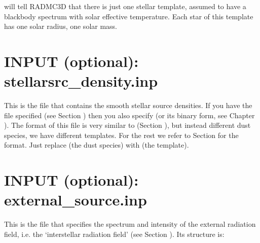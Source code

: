 \documentclass[letterpaper,10pt,english]{sphinxmanual}
\begin{document}
\begin{sphinxVerbatim}[commandchars=\\\{\}]
\end{sphinxVerbatim}

will tell RADMC\sphinxhyphen{}3D that there is just one stellar template, assumed to have
a blackbody spectrum with solar effective temperature. Each star of this
template has one solar radius, one solar mass.


\section{INPUT (optional): stellarsrc\_density.inp}
\label{\detokenize{inputoutputfiles:input-optional-stellarsrc-density-inp}}\label{\detokenize{inputoutputfiles:sec-stellarsrc-density}}
This is the file that contains the smooth stellar source densities. If you
have the file  specified (see Section
{\hyperref[\detokenize{inputoutputfiles:sec-stellarsrc-templates}]{}}) then you  also specify  (or its binary form, see Chapter
{\hyperref[\detokenize{binaryio:chap-binary-io}]{}}).  The format of this file is very similar to
 (Section {\hyperref[\detokenize{inputoutputfiles:sec-dustdens}]{}}), but instead
different dust species, we have different templates.  For the rest we refer
to Section {\hyperref[\detokenize{inputoutputfiles:sec-dustdens}]{}} for the format.  Just replace  (the dust species) with  (the template).


\section{INPUT (optional): external\_source.inp}
\label{\detokenize{inputoutputfiles:input-optional-external-source-inp}}\label{\detokenize{inputoutputfiles:sec-ext-src-inp}}
This is the file that specifies the spectrum and intensity of the
external radiation field, i.e. the ‘interstellar radiation field’
(see Section {\hyperref[\detokenize{stars:sec-external-source}]{}}). Its structure is:
\end{document}
